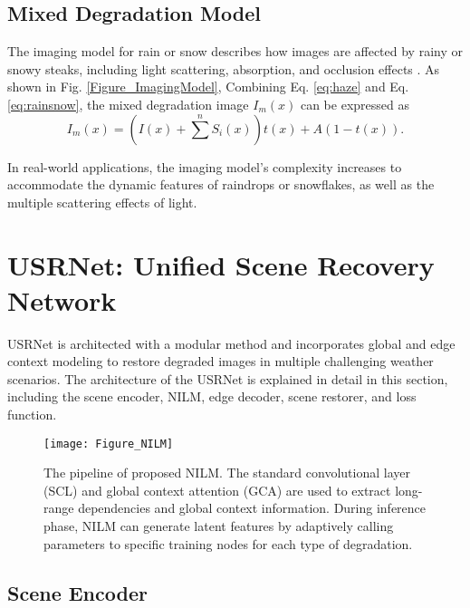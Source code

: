 \documentclass[final,12pt]{elsarticle}
\begin{document}
\subsection{Mixed Degradation Model}
%
    The imaging model for rain or snow describes how images are affected by rainy or snowy steaks, including light scattering, absorption, and occlusion effects \citep{zhang2023data}. As shown in Fig. \ref{Figure_ImagingModel}, Combining Eq. \ref{eq:haze} and Eq. \ref{eq:rainsnow}, the mixed degradation image $I_m(x)$ can be expressed as
    \begin{equation}\label{eq:model}
        I_m(x) = (I(x)+\sum^{n} S_{i}(x)) t(x) + A (1 - t(x)).
    \end{equation}    

    In real-world applications, the imaging model's complexity increases to accommodate the dynamic features of raindrops or snowflakes, as well as the multiple scattering effects of light.

\section{USRNet: Unified Scene Recovery Network}\label{sec:usrnet}
%
    USRNet is architected with a modular method and incorporates global and edge context modeling to restore degraded images in multiple challenging weather scenarios. The architecture of the USRNet is explained in detail in this section, including the scene encoder, NILM, edge decoder, scene restorer, and loss function.
    \begin{figure*}[t]
        \centering
        \setlength{\abovecaptionskip}{0.cm}
        \texttt{[image: Figure\_NILM]}
        \caption{The pipeline of proposed NILM. The standard convolutional layer (SCL) and global context attention (GCA) are used to extract long-range dependencies and global context information. During inference phase, NILM can generate latent features by adaptively calling parameters to specific training nodes for each type of degradation.}
        \label{Figure_NILM}
    \end{figure*}
% 
\subsection{Scene Encoder}
%
\end{document}
